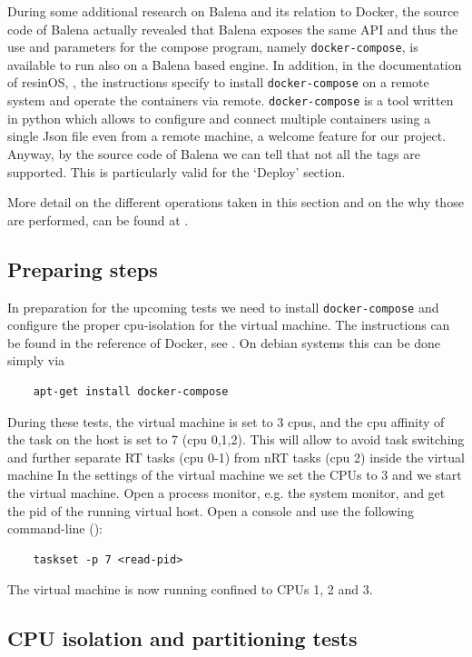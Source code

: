 \documentclass[]{scrartcl}
\begin{document}
During some additional research on Balena and its relation to Docker, the source code of Balena actually revealed that Balena exposes the same API and thus the use and parameters for the compose program, namely \texttt{docker-compose}, is available to run also on a Balena based engine. In addition, in the documentation of resinOS, \cite{resin03}, the instructions specify to install \texttt{docker-compose} on a remote system and operate the containers via remote.
\texttt{docker-compose} is a tool written in python which allows to configure and connect multiple containers using a single Json file even from a remote machine, a welcome feature for our project.
Anyway, by the source code of Balena we can tell that not all the tags are supported. This is particularly valid for the `Deploy' section. 

More detail on the different operations taken in this section and on the why those are performed, can be found at \cite{lrt01}.

\subsection{Preparing steps}

In preparation for the upcoming tests we need to install \texttt{docker-compose} and configure the proper cpu-isolation for the virtual machine.
The instructions can be found in the reference of Docker, see \cite{docker05}. 
On debian systems this can be done simply via 

\begin{verbatim}
	apt-get install docker-compose
\end{verbatim}

During these tests, the virtual machine is set to 3 cpus, and the cpu affinity of the task on the host is set to 7 (cpu 0,1,2). This will allow to avoid task switching and further separate RT tasks (cpu 0-1) from nRT tasks (cpu 2) inside the virtual machine
In the settings of the virtual machine we set the CPUs to 3 and we start the virtual machine.  Open a process monitor, e.g. the system monitor, and get the pid of the running virtual host. Open a console and use the following command-line (\cite{vbox01}):

\begin{verbatim}
	taskset -p 7 <read-pid>
\end{verbatim} 

The virtual machine is now running confined to CPUs 1, 2 and 3.

\subsection{CPU isolation and partitioning tests}
\end{document}
